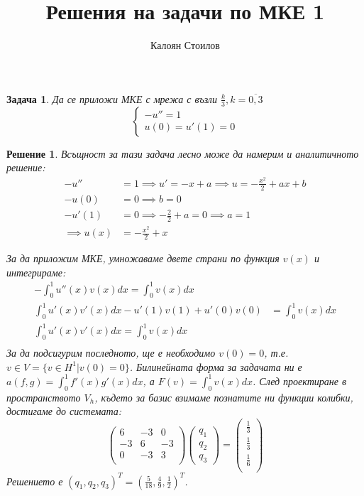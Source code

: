 \documentclass[12pt]{article}
\title{Решения на задачи по МКЕ 1}
\author{Калоян Стоилов}
\newtheorem{problem}{Задача}
\newtheorem*{solution*}{Решение}
\begin{document}
\maketitle
\begin{Large}
\begin{problem}
Да се приложи МКЕ с мрежа с възли $\frac{k}{3}, k=\overline{0,3}$ 
\begin{equation}
    \begin{cases}
      -u'' = 1 \\
      u\left(0\right)=u'\left(1\right)=0
    \end{cases}
\end{equation}
\end{problem}

\begin{solution*}
Всъщност за тази задача лесно може да намерим и аналитичното решение:
\begin{align*}
-u'' &= 1 \implies u' = -x + a \implies u = -\frac{x^2}{2} + ax + b \\
-u\left(0\right) &= 0 \implies b = 0 \\
-u'\left(1\right) &= 0 \implies -\frac{2}{2} + a = 0 \implies a=1 \\
\implies u(x) &= -\frac{x^2}{2}+x
\end{align*}

За да приложим МКЕ, умножаваме двете страни по функция $v(x)$ и интегрираме:
\begin{align*}
-\int_{0}^{1}u''(x)v(x)dx = \int_{0}^{1}v(x)dx \\
\int_{0}^{1}u'(x)v'(x)dx - u'\left(1\right)v\left(1\right)+ u'\left(0\right)v\left(0\right) &= \int_{0}^{1}v(x)dx \\
\int_{0}^{1}u'(x)v'(x)dx = \int_{0}^{1}v(x)dx \\
\end{align*}
За да подсигурим последното, ще е необходимо $v\left(0\right)=0$, т.е. $v \in V = \{v \in H^1 \vert v\left(0\right)=0\}$. Билинейната форма за задачата ни е $a\left(f, g\right)=\int_{0}^{1}f'(x)g'(x)dx$, а $F\left(v\right)=\int_{0}^{1}v(x)dx$. След проектиране в пространството $V_h$, където за базис взимаме познатите ни функции колибки,  достигаме до системата: 
\begin{equation}
	\begin{pmatrix}
	6 & -3 & 0 \\
	-3 & 6 & -3 \\
	0 & -3 & 3 \\
	\end{pmatrix}
	\begin{pmatrix}
      q_1 \\
      q_2 \\
      q_3
    \end{pmatrix}
    =
    \begin{pmatrix}
      \frac{1}{3} \\
      \frac{1}{3} \\
      \frac{1}{6} \\
    \end{pmatrix}
\end{equation}
Решението е $(q_1, q_2, q_3)^T = (\frac{5}{18}, \frac{4}{9}, \frac{1}{2})^T$.
\end{solution*}


\end{Large}
\end{document}
